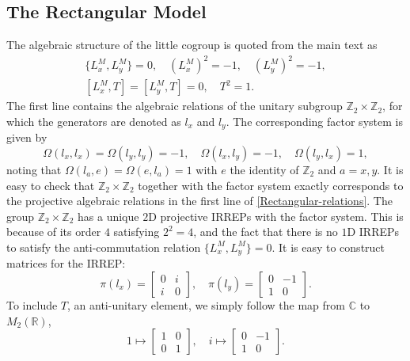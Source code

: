\documentclass[aps,prl,twocolumn,noshowpacs,superscriptaddress]{revtex4-1}
\def \Z {\mathbb{Z}}
\begin{document}
\subsection{The Rectangular Model}
The algebraic structure of the little cogroup is quoted from the main text as
\begin{gather}\label{Rectangular-relations}
	\{L_x^M,L_y^M\}=0,\quad (L^M_x)^2=-1,\quad (L^M_y)^2=-1,\nonumber \\ 
	[L_x^M,T]=[L_y^M,T]=0, \quad T^2=1.
\end{gather}
The first line contains the algebraic relations of the unitary subgroup $\Z_2\times\Z_2$, for which the generators are denoted as $l_x$ and $l_y$. The corresponding factor system is given by
\begin{equation}
	\Omega(l_x,l_x)=\Omega(l_y,l_y)=-1,\quad \Omega(l_x,l_y)=-1,\quad \Omega(l_y,l_x)=1,
\end{equation}
noting that $\Omega(l_a,e)=\Omega(e,l_a)=1$ with $e$ the identity of $\Z_2$ and $a=x,y$. It is easy to check that $\Z_2\times\Z_2$ together with the factor system exactly corresponds to the projective algebraic relations in the first line of \eqref{Rectangular-relations}. The group $\Z_2\times\Z_2$ has a unique $2$D projective IRREPs with the factor system. This is because of its order $4$ satisfying $2^2=4$, and the fact that there is no $1$D IRREPs to satisfy the anti-commutation relation $\{L_x^M,L_y^M\}=0$. It is easy to construct matrices for the IRREP:
\begin{equation}
	\pi(l_x)=\begin{bmatrix}
		0 & i\\
		i & 0
	\end{bmatrix},\quad 
	\pi(l_y)=\begin{bmatrix}
		0 & -1\\
		1 & 0
	\end{bmatrix}.
\end{equation}
To include $T$, an anti-unitary element, we simply follow the map from $\mathbb{C}$ to $M_2(\mathbb{R})$,
\begin{equation}
	1\mapsto \begin{bmatrix}
		1 & 0\\
		0 & 1
	\end{bmatrix},\quad 
	i\mapsto \begin{bmatrix}
		0 & -1\\
		1 & 0
	\end{bmatrix}.
\end{equation}
\end{document}
